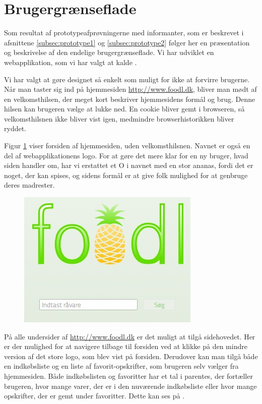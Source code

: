 \section{Brugergrænseflade}
\label{sec:webapplikationen}

Som resultat af prototypeafprøvningerne med informanter, som er beskrevet i afsnittene \ref{subsec:prototype1} og \ref{subsec:prototype2} følger her en præsentation og beskrivelse af den endelige brugergrænseflade. Vi har udviklet en webapplikation, som vi har valgt at kalde \Foodl{}.

Vi har valgt at gøre designet så enkelt som muligt for ikke at forvirre brugerne. Når man taster sig ind på hjemmesiden \url{http://www.foodl.dk}, bliver man mødt af en velkomsthilsen, der meget kort beskriver hjemmesidens formål og brug. Denne hilsen kan brugeren vælge at lukke ned. En cookie bliver gemt i browseren, så velkomsthilsnen ikke bliver vist igen, medmindre browserhistorikken bliver ryddet.

Figur \ref{fig:foodl-forside} viser forsiden af hjemmesiden, uden velkomsthilsnen. Navnet \Foodl{} er også en del af webapplikationens logo. For at gøre det mere klar for en ny bruger, hvad siden handler om, har vi erstattet et O i navnet med en stor ananas, fordi det er noget, der kan spises, og sidens formål er at give folk mulighed for at genbruge deres madrester. 

\begin{figure}[H]
	\centering
	\includegraphics[scale=0.7]{billeder/foodl/forside.jpg}
	\label{fig:foodl-forside}
\end{figure}

På alle undersider af \url{http://www.foodl.dk} er det muligt at tilgå sidehovedet. Her er der mulighed for at navigere tilbage til forsiden ved at klikke på den mindre version af det store logo, som blev vist på forsiden. Derudover kan man tilgå både en indkøbsliste og en liste af favorit-opskrifter, som brugeren selv vælger fra hjemmesiden. Både indkøbslisten og favoritter har et tal i parentes, der \fx fortæller brugeren, hvor mange varer, der er i den nuværende indkøbsliste eller hvor mange opskrifter, der er gemt under favoritter. Dette kan ses på .

